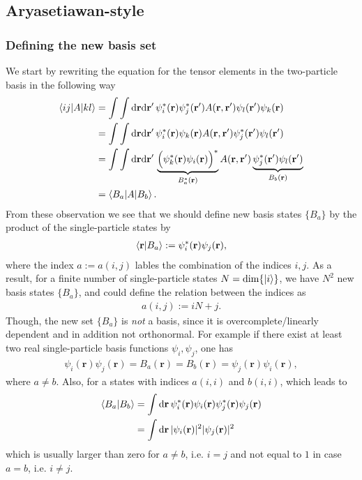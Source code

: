 \documentclass[12pt,a4paper]{scrartcl}
\numberwithin{equation}{section}
\renewcommand{\vec}{\mathbf}
\begin{document}

\subsection{Aryasetiawan-style}
\subsubsection{Defining the new basis set}
We start by rewriting the equation for the tensor elements in the two-particle basis in the 
following way 
\begin{align}
 \braket{ij | A | kl }  
&= \int \int \mathrm{d}\vec{r}\mathrm{d}\vec{r}' \, \psi^*_i(\vec{r})\psi^*_j(\vec{r}') 
                                          A(\vec{r},\vec{r}') \psi_l(\vec{r}')\psi_k(\vec{r}) \\
%
&= \int \int \mathrm{d}\vec{r}\mathrm{d}\vec{r}' \, \psi^*_i(\vec{r})\psi_k(\vec{r}) 
                                          A(\vec{r},\vec{r}') \psi^*_j(\vec{r}')\psi_l(\vec{r}') \\
%
&= \int \int \mathrm{d}\vec{r}\mathrm{d}\vec{r}' \, \underbrace{ \Big( \psi^*_k(\vec{r}) \psi_i(\vec{r}) \Big)^* }_{B^*_a(\vec{r})}
                                          A(\vec{r},\vec{r}') \underbrace{ \psi^*_j(\vec{r}')\psi_l(\vec{r}') }_{B_b(\vec{r} )} \\
&= \braket{ B_a | A | B_b } .
\end{align}
From these observation we see that we should define new basis states $\{ B_a \}$ by the product of the single-particle
states by
\begin{align}
 \braket{ \vec{r} | B_a } := \psi^*_i(\vec{r}) \psi_j(\vec{r}),
\end{align}
where the index $a:=a(i,j)$ lables the combination of the indices $i,j$. As a result, for a finite number of single-particle
states $N=\mathrm{dim}\{ \ket{i} \}$, we have $N^2$ new basis states $\{ B_a \}$, and could define the relation between the indices
as
\begin{align}
 a(i,j) := iN + j.
\end{align}
Though, the new set $\{ B_a \}$ is \textit{not} a basis, since it is overcomplete/linearly dependent and in addition not orthonormal.
For example if there exist at least two real single-particle basis functions $\psi_i,\psi_j$, one has 
\begin{align}
\psi_i(\vec{r})\psi_j(\vec{r}) = B_a(\vec{r}) = B_b(\vec{r}) = \psi_j(\vec{r})\psi_i(\vec{r}),
\end{align}
where $a\neq b$.
Also, for a states with indices $a(i,i)$ and $b(i,i)$, which leads to
\begin{align}
 \braket{B_a | B_b} &= \int \mathrm{d}\vec{r} \, \psi^*_i(\vec{r}) \psi_i(\vec{r}) \psi^*_j(\vec{r}) \psi_j(\vec{r}) \\
 &= \int \mathrm{d}\vec{r} \, |\psi_i(\vec{r})|^2 |\psi_j(\vec{r})|^2 
\end{align}
which is usually larger than zero for $a\neq b$, i.e. $i=j$ and not equal to $1$ in case $a=b$, i.e. $i\neq j$.
\end{document}
